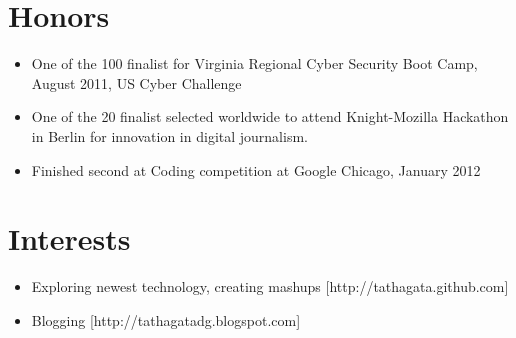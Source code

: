 \documentclass[a4paper, oneside, final]{scrartcl}
\begin{document}
\begin{center}

\section{Honors}
\begin{itemize}
\small\sffamily{}
\item One of the 100 finalist for Virginia Regional Cyber Security Boot Camp, August 2011, US Cyber Challenge
\vspace{-0.3cm}
\item One of the 20 finalist selected worldwide to attend Knight-Mozilla Hackathon in Berlin for innovation in digital journalism.
\vspace{-0.3cm}
\item Finished second at Coding competition at Google Chicago, January 2012
\end{itemize} 

\section{Interests}
\begin{itemize}
\small\sffamily{}
\item Exploring newest technology, creating mashups [http://tathagata.github.com]
\vspace{-0.3cm}
\item Blogging [http://tathagatadg.blogspot.com]
\end{itemize} 


\end{center}
\end{document}
